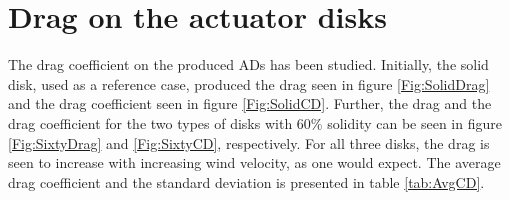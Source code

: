 \section{Drag on the actuator disks}

The drag coefficient on the produced ADs has been studied. Initially, the solid disk, used as a reference case, produced the drag seen in figure \ref{Fig:SolidDrag} and the drag coefficient seen in figure \ref{Fig:SolidCD}. Further, the drag and the drag coefficient for the two types of disks with 60\% solidity can be seen in figure \ref{Fig:SixtyDrag} and \ref{Fig:SixtyCD}, respectively. For all three disks, the drag is seen to increase with increasing wind velocity, as one would expect. The average drag coefficient and the standard deviation is presented in table \ref{tab:AvgCD}.


